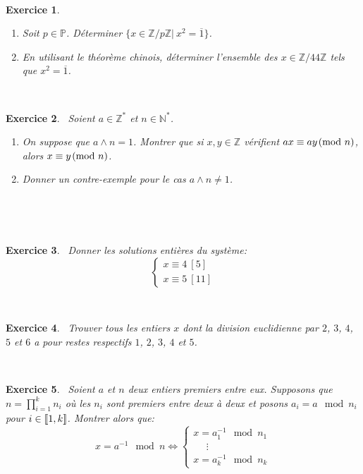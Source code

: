 \documentclass[11pt,a4paper]{article}
\newtheorem{ex}{Exercice}
\newcommand{\Z}{\mathbb{Z}}
\begin{document}
\

\begin{ex}
\begin{enumerate}
\item Soit $p\in \mathbb{P}$. Déterminer $\{x\in \Z/p\Z|\ x^2=\overline{1}\}$.

\item En utilisant le théorème chinois, déterminer l'ensemble des $x\in \Z/44\Z$ tels que $x^2=\overline{1}$.
\end{enumerate}


\end{ex}


\

\begin{ex}\
Soient $a \in \mathbb{Z}^*$ et $n \in \mathbb{N}^* $. \begin{enumerate}
\item On suppose que $a\wedge n=1$. Montrer que si $x,y\in \Z$ vérifient  $ ax \equiv ay \! \! \pmod {n}  $, alors $ x \equiv y \! \! \pmod {n}$.

\item Donner un contre-exemple pour le cas $a\wedge n\neq 1 $.
\end{enumerate} 
\end{ex}

\


\

\begin{ex}\
Donner les solutions entières du système:
$$ \left \{ \begin{array}{l}
{x}\equiv {4} \ [{5}] \\
{x} \equiv {5} \ [{11}]
\end{array} \right.   $$
\end{ex}

\



\begin{ex}\
Trouver tous les entiers $x$ dont la division euclidienne par $2$, $3$, $4$, $5$ et $6$ a pour restes respectifs $1$, $2$, $3$, $4$ et $5$.
\end{ex}
\



\begin{ex}\
Soient $a$ et $n$ deux entiers premiers entre eux. Supposons que $n=\prod_{i=1}^k n_i$ où les $n_i$ sont premiers entre deux à deux et posons $ a_i= a \! \mod n_i$ pour $i \in \llbracket 1,k \rrbracket$. Montrer alors que:
$$ x=a^{-1}\! \! \! \! \!  \mod n \Longleftrightarrow \left \{ \begin{array}{c}
x= a_1^{-1} \! \! \! \! \! \mod n_1 \\
\ \ \ \ \ \ \vdots  \\
x= a_k^{-1} \! \! \! \! \! \mod n_k 
\end{array} \right.    $$

\end{ex}
\end{document}
